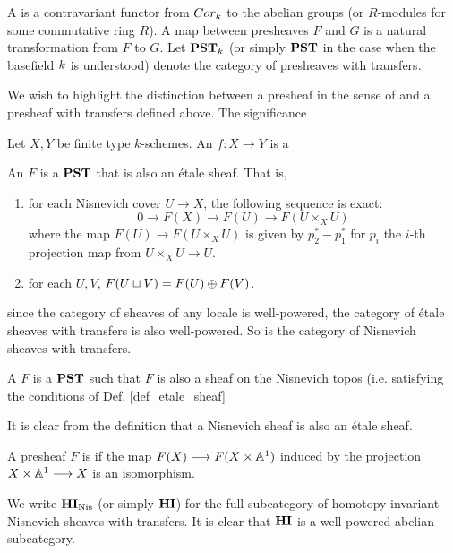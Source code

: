 \begin{defn}\label{def_pst}
A  is a contravariant functor from 
$Cor_k$ to the abelian groups (or $R$-modules for some 
commutative ring $R$). A map between presheaves $F$ and $G$ is a 
natural transformation from $F$ to $G$. Let $\mathbf{PST}_{k}$ (or
simply $\mathbf{PST}$ in the case when the basefield $k$ is 
understood) denote the category of presheaves with transfers.
\end{defn}

\begin{rmk}
We wish to highlight the distinction between a presheaf in the 
sense of \cite{Hart} and a presheaf with transfers defined above.
The significance
\end{rmk}

\begin{defn}
Let $X, Y$ be finite type $k$-schemes. An  
$f: X \to Y$ is a 
\end{defn}

\begin{defn}\label{def_etale_sheaf}
An  $F$ is a $\mathbf{PST}$ that is also
an \'etale sheaf. That is,
\begin{enumerate}
\item for each Nisnevich cover $U \to X$, the following sequence 
is exact:
\[
0 \to F(X) \to F(U) \to F(U \times_X U)
\]
where the map $F(U) \to F(U \times_X U)$ is given by $p_2^* - 
p_1^*$ for $p_i$ the $i$-th projection map from $U \times_X U
\to U$.

\item for each $U, V$, $F(U \sqcup V) = F(U) \oplus F(V)$.
\end{enumerate}
\end{defn}

since the category of sheaves of any locale is well-powered, the 
category of \'etale sheaves with transfers is also well-powered. 
So is the category of Nisnevich sheaves with transfers.



\begin{defn}\label{def_nis_sheaf}
A  $F$ is a $\mathbf{PST}$ such that $F$ is also a
sheaf on the Nisnevich topos (i.e. satisfying the conditions of
Def. \ref{def_etale_sheaf}
\end{defn}

\begin{rmk}
It is clear from the definition that a Nisnevich sheaf is also
an \'etale sheaf.
\end{rmk}

\begin{defn}
A presheaf $F$ is  if the map $F(X) \longrightarrow 
F(X \times \mathbb{A}^1)$ induced by the projection $X \times \mathbb{A}^1 \longrightarrow X$ 
is an isomorphism.

We write $\mathbf{HI}_{\mathrm{Nis}}$ (or simply $\mathbf{HI}$) for the full subcategory of 
homotopy invariant Nisnevich sheaves with transfers. It is clear
that $\mathbf{HI}$ is a well-powered abelian subcategory.
\end{defn}
